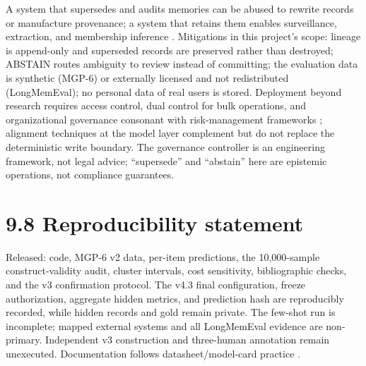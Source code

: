 A system that supersedes and audits memories can be abused to rewrite
records or manufacture provenance; a system that retains them enables
surveillance, extraction, and membership inference
\citep{carlini2021extracting, shokri2017membership, bender2021dangers, weidinger2022taxonomy}.
Mitigations in this project's scope: lineage is append-only and
superseded records are preserved rather than destroyed; ABSTAIN routes
ambiguity to review instead of committing; the evaluation data is
synthetic (MGP-6) or externally licensed and not redistributed
(LongMemEval); no personal data of real users is stored. Deployment
beyond research requires access control, dual control for bulk
operations, and organizational governance consonant with risk-management
frameworks \citep{nist2023airmf}; alignment techniques at the model
layer \citep{ouyang2022training, bai2022constitutional} complement but
do not replace the deterministic write boundary. The governance
controller is an engineering framework, not legal advice; ``supersede''
and ``abstain'' here are epistemic operations, not compliance
guarantees.

\section{9.8 Reproducibility statement}\label{reproducibility-statement}

Released: code, MGP-6 v2 data, per-item predictions, the 10,000-sample
construct-validity audit, cluster intervals, cost sensitivity,
bibliographic checks, and the v3 confirmation protocol. The v4.3 final
configuration, freeze authorization, aggregate hidden metrics, and
prediction hash are reproducibly recorded, while hidden records and gold
remain private. The few-shot run is incomplete; mapped external systems
and all LongMemEval evidence are non-primary. Independent v3
construction and three-human annotation remain unexecuted. Documentation
follows datasheet/model-card practice
\citep{gebru2021datasheets, mitchell2019modelcards}.
